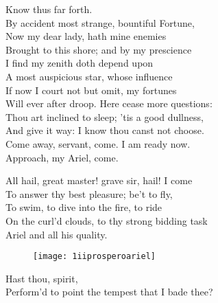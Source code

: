 \begin{verse_speech}[Prospero] 
Know thus far forth.\\
By accident most strange, bountiful Fortune,\\
Now my dear lady, hath mine enemies\\
Brought to this shore; and by my prescience\\
I find my zenith doth depend upon\\
A most auspicious star, whose influence\\
If now I court not but omit, my fortunes\\
Will ever after droop. Here cease more questions:\\
Thou art inclined to sleep; 'tis a good dullness,\\
And give it way: I know thou canst not choose.\\
Come away, servant, come. I am ready now.\\
Approach, my Ariel, come.\\
\end{verse_speech}

\begin{verse_speech}[Ariel] 
All hail, great master! grave sir, hail! I come\\
To answer thy best pleasure; be't to fly,\\
To swim, to dive into the fire, to ride\\
On the curl'd clouds, to thy strong bidding task\\
Ariel and all his quality.
\end{verse_speech}

\begin{figure}[tbh]
\centering
\texttt{[image: 1iiprosperoariel]}
\end{figure}

\begin{verse_speech}[Prospero] 
Hast thou, spirit,\\
Perform'd to point the tempest that I bade thee?
\end{verse_speech}

